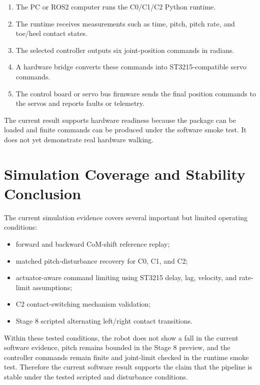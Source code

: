 \begin{enumerate}
    \item The PC or ROS2 computer runs the C0/C1/C2 Python runtime.
    \item The runtime receives measurements such as time, pitch, pitch rate,
    and toe/heel contact states.
    \item The selected controller outputs six joint-position commands in
    radians.
    \item A hardware bridge converts these commands into ST3215-compatible
    servo commands.
    \item The control board or servo bus firmware sends the final position
    commands to the servos and reports faults or telemetry.
\end{enumerate}

The current result supports hardware readiness because the package can be
loaded and finite commands can be produced under the software smoke test. It
does not yet demonstrate real hardware walking.

\section{Simulation Coverage and Stability Conclusion}
\label{sec:simulation_coverage_stability_20260708}

The current simulation evidence covers several important but limited operating
conditions:

\begin{itemize}
    \item forward and backward CoM-shift reference replay;
    \item matched pitch-disturbance recovery for C0, C1, and C2;
    \item actuator-aware command limiting using ST3215 delay, lag, velocity,
    and rate-limit assumptions;
    \item C2 contact-switching mechanism validation;
    \item Stage 8 scripted alternating left/right contact transitions.
\end{itemize}

Within these tested conditions, the robot does not show a fall in the current
software evidence, pitch remains bounded in the Stage 8 preview, and the
controller commands remain finite and joint-limit checked in the runtime smoke
test. Therefore the current software result supports the claim that the
pipeline is stable under the tested scripted and disturbance conditions.

